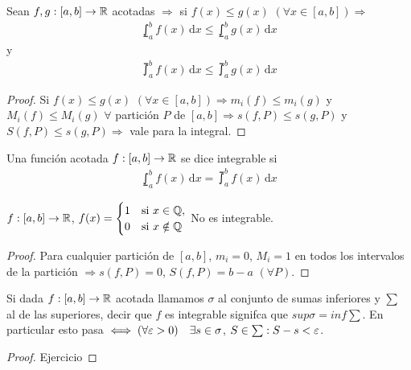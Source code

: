 \begin{prop}
  Sean $f, g: [a, b] \to \mathbb{R}$ acotadas $\Rightarrow$ si $f(x) \leq g(x)$ $(\forall x \in [a, b]) \Rightarrow$ \begin{align*}
    \lowint_a^b f(x)\,\mathrm{d}x \leq \lowint_a^b g(x)\,\mathrm{d}x
  \end{align*} y \begin{align*}
    \upint_a^b f(x)\, \mathrm{d}x \leq \upint_a^b g(x)\, \mathrm{d}x
  \end{align*}
  \begin{proof}
    Si $f(x) \leq g(x)$ $(\forall x \in [a, b]) \Rightarrow m_i(f) \leq m_i(g)$ y $M_i(f) \leq M_i(g)$ $\forall$ partición $P$ de $[a, b] \Rightarrow s(f, P) \leq s(g, P)$ y $S(f, P) \leq s(g, P) \Rightarrow$ vale para la integral.
  \end{proof}
\end{prop}

\begin{definition}[Integrable]
  Una función acotada $f: [a, b] \to \mathbb{R}$ se dice integrable si \begin{align*}
    \lowint_a^b f(x) \, \mathrm{d}x = \upint_a^b f(x) \, \mathrm{d}x
  \end{align*}
\end{definition}

\clearpage

\begin{eg}
  $f: [a, b] \to \mathbb{R}$, $f(x) = \begin{cases}
      1 & \text{si } x \in \mathbb{Q},   \\
      0 & \text{si } x \notin \mathbb{Q}
    \end{cases}$
  No es integrable.
  \begin{proof}
    Para cualquier partición de $[a, b]$, $m_i = 0$, $M_i = 1$ en todos los intervalos de la partición $\Rightarrow s(f, P) = 0$, $S(f, P) = b-a$ $(\forall P)$.
  \end{proof}
\end{eg}

\begin{note}
  Si dada $f: [a, b] \to \mathbb{R}$ acotada llamamos $\sigma$ al conjunto de sumas inferiores y $\sum$ al de las superiores, decir que $f$ es integrable signifca que $sup \sigma = inf \sum$.
  En particular esto pasa $\iff (\forall \varepsilon > 0) \quad \exists s \in \sigma$, $S \in \sum : S - s < \varepsilon$.
  \begin{proof}
    Ejercicio
  \end{proof}
\end{note}

